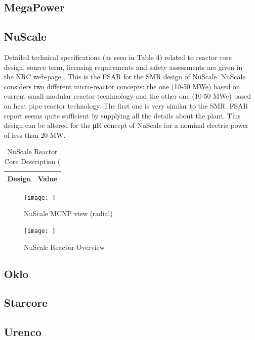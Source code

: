 \documentclass[10pt,a4paper]{article}
\begin{document}
\subsection{MegaPower}

\subsection{NuScale}
Detailed technical specifications (as seen in Table 4) related to reactor core design, source term, licensing requirements and safety assessments are given in the NRC web-page \cite{NuScale18}. This is the FSAR for the SMR design of NuScale. NuScale considers two different micro-reactor concepts: the one (10-50 MWe) based on current small modular reactor tecnhnology and the other one (10-50 MWe) based on heat pipe reactor technology. The first one is very similar to the SMR. FSAR report  seems quite sufficient by supplying all the details about the plant. This design can be altered for the μR concept of NuScale for a nominal electric power of less than 20 MW.

\begin{table} [ht]
\begin{center}

\caption{NuScale Reactor Core Description (\cite{NuScale18}}
\begin{tabular}{|l|l|}
\hline 
Design 		&Value \\ 
\hline 

\end{tabular}
\end{center}
\end{table}

\begin{figure}[hbtp]
\centering
\texttt{[image: ]}
\caption{NuScale MCNP view (radial)}
\end{figure}

\begin{figure}[hbtp]
\centering
\texttt{[image: ]}
\caption{NuScale Reactor Overview}
\end{figure}

\subsection{Oklo}

\subsection{Starcore}

\subsection{Urenco}
\end{document}
